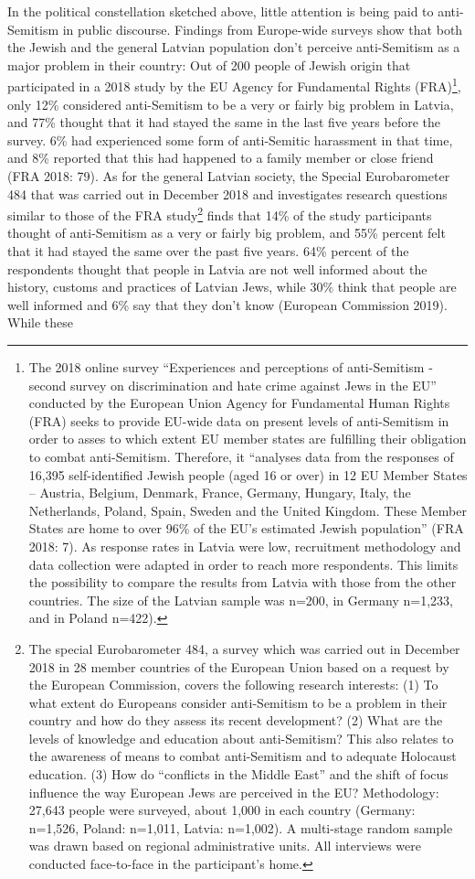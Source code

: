 In the political constellation sketched above, little attention is being paid to anti-Semitism in public discourse. Findings from Europe-wide surveys show that both the Jewish and the general Latvian population don't perceive anti-Semitism as a major problem in their country: Out of 200 people of Jewish origin that participated in a 2018 study by the EU Agency for Fundamental Rights (FRA)\footnote{The 2018 online survey ``Experiences and perceptions of anti-Semitism - second survey on discrimination and hate crime against Jews in the EU'' conducted by the European Union Agency for Fundamental Human Rights (FRA) seeks to provide EU-wide data on present levels of anti-Semitism in order to asses to which extent EU member states are fulfilling their obligation to combat anti-Semitism. Therefore, it ``analyses data from the responses of 16,395 self-identified Jewish people (aged 16 or over) in 12 EU Member States – Austria, Belgium, Denmark, France, Germany, Hungary, Italy, the Netherlands, Poland, Spain, Sweden and the United Kingdom. These Member States are home to over 96\% of the EU’s estimated Jewish population'' (FRA 2018: 7). As response rates in Latvia were low, recruitment methodology and data collection were adapted in order to reach more respondents. This limits the possibility to compare the results from Latvia with those from the other countries. The size of the Latvian sample was n=200, in Germany n=1,233, and in Poland n=422).}, only 12\% considered anti-Semitism to be a very or fairly big problem in Latvia, and 77\% thought that it had stayed the same in the last five years before the survey. 6\% had experienced some form of anti-Semitic harassment in that time, and 8\% reported that this had happened to a family member or close friend (FRA 2018: 79). As for the general Latvian society, the Special Eurobarometer 484 that was carried out in December 2018 and investigates research questions similar to those of the FRA study\footnote{The special Eurobarometer 484, a survey which was carried out in December 2018 in 28 member countries of the European Union based on a request by the European Commission, covers the following research interests: (1) To what extent do Europeans consider anti-Semitism to be a problem in their country and how do they assess its recent development? (2) What are the levels of knowledge and education about anti-Semitism? This also relates to the awareness of means to combat anti-Semitism and to adequate Holocaust education. (3) How do ``conflicts in the Middle East'' and the shift of focus influence the way European Jews are perceived in the EU? Methodology: 27,643 people were surveyed, about 1,000 in each country (Germany: n=1,526, Poland: n=1,011, Latvia: n=1,002). A multi-stage random sample was drawn based on regional administrative units. All interviews were conducted face-to-face in the participant’s home.} finds that 14\% of the study participants thought of anti-Semitism as a very or fairly big problem, and 55\% percent felt that it had stayed the same over the past five years. 64\% percent of the respondents thought that people in Latvia are not well informed about the history, customs and practices of Latvian Jews, while 30\% think that people are well informed and 6\% say that they don't know (European Commission 2019). While these 